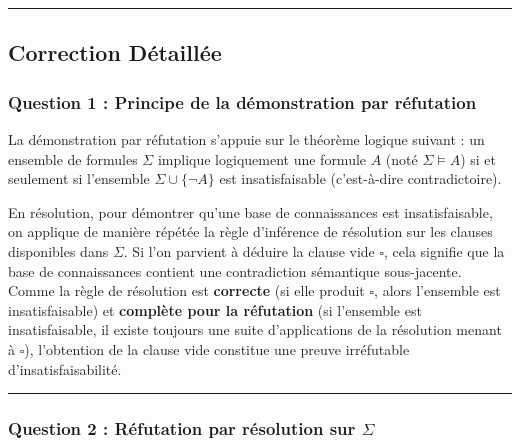 \documentclass[11pt,a4paper]{article}
\begin{document}
\begin{center}\rule{0.5\linewidth}{0.5pt}\end{center}

\hypertarget{correction-duxe9tailluxe9e}{%
\subsection{Correction Détaillée}\label{correction-duxe9tailluxe9e}}

\hypertarget{question-1-principe-de-la-duxe9monstration-par-ruxe9futation}{%
\subsubsection{Question 1 : Principe de la démonstration par
réfutation}\label{question-1-principe-de-la-duxe9monstration-par-ruxe9futation}}

La démonstration par réfutation s'appuie sur le théorème logique suivant
: un ensemble de formules \(\Sigma\) implique logiquement une formule
\(A\) (noté \(\Sigma \models A\)) si et seulement si l'ensemble
\(\Sigma \cup \{\neg A\}\) est insatisfaisable (c'est-à-dire
contradictoire).

En résolution, pour démontrer qu'une base de connaissances est
insatisfaisable, on applique de manière répétée la règle d'inférence de
résolution sur les clauses disponibles dans \(\Sigma\). Si l'on parvient
à déduire la clause vide \(\square\), cela signifie que la base de
connaissances contient une contradiction sémantique sous-jacente. Comme
la règle de résolution est \textbf{correcte} (si elle produit
\(\square\), alors l'ensemble est insatisfaisable) et \textbf{complète
pour la réfutation} (si l'ensemble est insatisfaisable, il existe
toujours une suite d'applications de la résolution menant à
\(\square\)), l'obtention de la clause vide constitue une preuve
irréfutable d'insatisfaisabilité.

\begin{center}\rule{0.5\linewidth}{0.5pt}\end{center}

\hypertarget{question-2-ruxe9futation-par-ruxe9solution-sur-sigma}{%
\subsubsection{\texorpdfstring{Question 2 : Réfutation par résolution
sur
\(\Sigma\)}{Question 2 : Réfutation par résolution sur \textbackslash Sigma}}\label{question-2-ruxe9futation-par-ruxe9solution-sur-sigma}}
\end{document}
